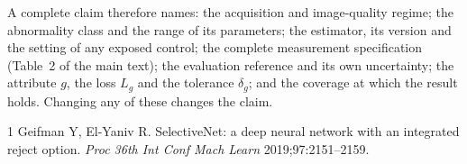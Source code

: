 \documentclass[10pt,a4paper]{article}
\begin{document}
A complete claim therefore names: the acquisition and image-quality regime; the abnormality class
and the range of its parameters; the estimator, its version and the setting of any exposed control;
the complete measurement specification (Table~2 of the main text); the evaluation reference and its
own uncertainty; the attribute $g$, the loss $L_g$ and the tolerance $\delta_g$; and the coverage at
which the result holds. Changing any of these changes the claim.

\begin{thebibliography}{1}
Geifman Y, El-Yaniv R. SelectiveNet: a deep neural network with an integrated reject option.
\emph{Proc 36th Int Conf Mach Learn} 2019;97:2151--2159.
\end{thebibliography}
\end{document}
